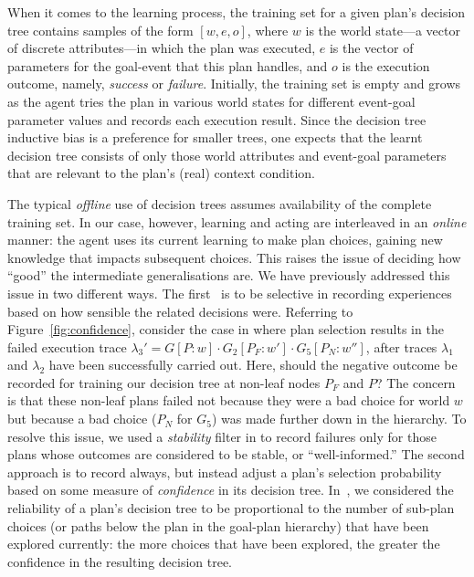 When it comes to the learning process, the training set for a given plan's decision tree contains samples of the form $[w, e, o]$, where $w$ is the world state---a vector of discrete attributes---in which the plan was executed, $e$ is the vector of parameters for the goal-event that this plan handles, and $o$ is the execution outcome, namely, \emph{success} or \emph{failure}. Initially, the training set is empty and grows as the agent tries the plan in various world states for different event-goal parameter values and records each execution result. 
Since the decision tree inductive bias is a preference for smaller trees, one expects that the learnt decision tree consists of only those world attributes and event-goal parameters that are relevant to the plan's (real) context condition.

The typical {\em offline} use of decision trees assumes availability of the complete training set. In our case, however, learning and acting are interleaved in an {\em online} manner: the agent uses its current learning to make plan choices, gaining new knowledge that impacts subsequent choices. This raises the issue of deciding how ``good'' the intermediate generalisations are. We have previously addressed this issue in two different ways. The first~\cite{airiau09:enhancing} is to be selective in recording experiences based on how sensible the related decisions were. 
Referring to Figure~\ref{fig:confidence}, consider the case in  where plan selection results in the failed execution trace $\lambda_3' = G[P:w] \cdot G_2[P_F:w'] \cdot G_5[P_N:w'']$, after traces $\lambda_1$ and $\lambda_2$ have been successfully carried out. 
Here, should the negative outcome be recorded for training our decision tree at non-leaf nodes $P_F$ and $P$? The concern is that these non-leaf plans failed not because they were a bad choice for world $w$ but because a bad choice ($P_N$ for $G_5$) was made further down in the hierarchy. To resolve this issue, we used a {\em stability} filter in \cite{airiau09:enhancing} to record failures only for those plans whose outcomes are considered to be stable, or ``well-informed.'' 
The second approach is to record always, but instead adjust a plan's selection probability based on some measure of {\em confidence} in its decision tree. In~\cite{singh10:extending,singh10:learning}, we considered the reliability of a plan's decision tree to be proportional to the number of sub-plan choices (or paths below the plan in the goal-plan hierarchy) that have been explored currently: the more choices that have been explored, the greater the confidence in the resulting decision tree. 


